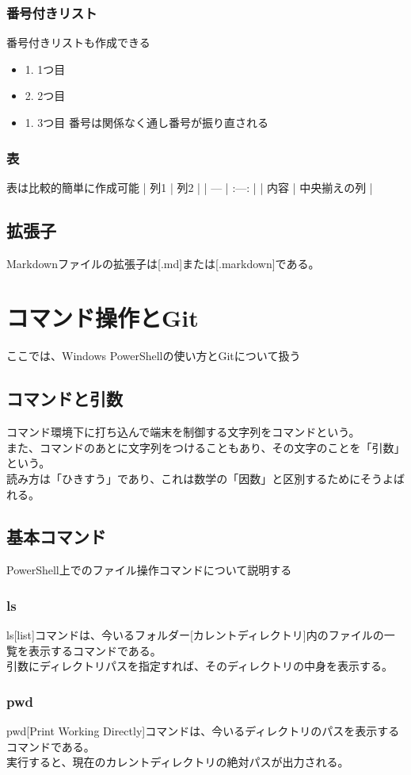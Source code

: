 \documentclass{ltjsarticle}
\begin{document}
\subsubsection{番号付きリスト}
番号付きリストも作成できる
\begin{itemize}
    \item 1. 1つ目
    \item 2. 2つ目
    \item 1. 3つ目 番号は関係なく通し番号が振り直される
\end{itemize}
\subsubsection{表}
表は比較的簡単に作成可能
| 列1 | 列2 |
| --- | :---: |
| 内容 | 中央揃えの列 |
\subsection{拡張子}
Markdownファイルの拡張子は[.md]または[.markdown]である。
\section{コマンド操作とGit}
ここでは、Windows PowerShellの使い方とGitについて扱う
\subsection{コマンドと引数}
コマンド環境下に打ち込んで端末を制御する文字列をコマンドという。\\
また、コマンドのあとに文字列をつけることもあり、その文字のことを「引数」という。\\
読み方は「ひきすう」であり、これは数学の「因数」と区別するためにそうよばれる。
\subsection{基本コマンド}
PowerShell上でのファイル操作コマンドについて説明する
\subsubsection{ls}
ls[list]コマンドは、今いるフォルダー[カレントディレクトリ]内のファイルの一覧を表示するコマンドである。\\
引数にディレクトリパスを指定すれば、そのディレクトリの中身を表示する。
\subsubsection{pwd}
pwd[Print Working Directly]コマンドは、今いるディレクトリのパスを表示するコマンドである。\\
実行すると、現在のカレントディレクトリの絶対パスが出力される。
\end{document}
